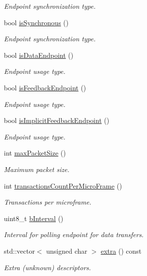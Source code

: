 \begin{DoxyCompactItemize}
\begin{DoxyCompactList}\small\item\em Endpoint synchronization type. \end{DoxyCompactList}\item 
bool \hyperlink{classmdt_usb_endpoint_descriptor_a83d8d0ae021ca27067044a6ecc72cff6}{is\-Synchronous} ()
\begin{DoxyCompactList}\small\item\em Endpoint synchronization type. \end{DoxyCompactList}\item 
bool \hyperlink{classmdt_usb_endpoint_descriptor_af7f74090d6964f908fb556a04853c873}{is\-Data\-Endpoint} ()
\begin{DoxyCompactList}\small\item\em Endpoint usage type. \end{DoxyCompactList}\item 
bool \hyperlink{classmdt_usb_endpoint_descriptor_a4a0da79423ca913e32016b89e5b48e5c}{is\-Feedback\-Endpoint} ()
\begin{DoxyCompactList}\small\item\em Endpoint usage type. \end{DoxyCompactList}\item 
bool \hyperlink{classmdt_usb_endpoint_descriptor_a9a22e038a2e227af30e77d596f4990fa}{is\-Implicit\-Feedback\-Endpoint} ()
\begin{DoxyCompactList}\small\item\em Endpoint usage type. \end{DoxyCompactList}\item 
int \hyperlink{classmdt_usb_endpoint_descriptor_ae7bdf4803a50206fdb9b30008b9bc230}{max\-Packet\-Size} ()
\begin{DoxyCompactList}\small\item\em Maximum packet size. \end{DoxyCompactList}\item 
int \hyperlink{classmdt_usb_endpoint_descriptor_acc5881f4e94f4b1014ecbe9f6a3f3405}{transactions\-Count\-Per\-Micro\-Frame} ()
\begin{DoxyCompactList}\small\item\em Transactions per microframe. \end{DoxyCompactList}\item 
uint8\-\_\-t \hyperlink{classmdt_usb_endpoint_descriptor_a75824361730584c2c248b74354b6af52}{b\-Interval} ()
\begin{DoxyCompactList}\small\item\em Interval for polling endpoint for data transfers. \end{DoxyCompactList}\item 
std\-::vector$<$ unsigned char $>$ \hyperlink{classmdt_usb_endpoint_descriptor_a20e2c22e66be26495142168c390aea34}{extra} () const 
\begin{DoxyCompactList}\small\item\em Extra (unknown) descriptors. \end{DoxyCompactList}\end{DoxyCompactItemize}


